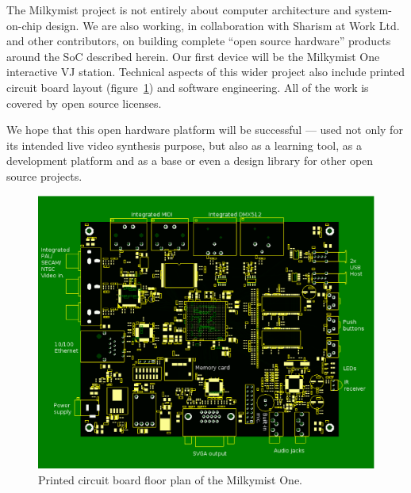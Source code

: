 \documentclass[a4paper,11pt]{kthesis}
\begin{document}
The Milkymist project is not entirely about computer architecture and system-on-chip design. We are also working, in collaboration with Sharism at Work Ltd. and other contributors, on building complete ``open source hardware'' products around the SoC described herein. Our first device will be the Milkymist One interactive VJ station. Technical aspects of this wider project also include printed circuit board layout (figure~\ref{fig:mm1}) and software engineering. All of the work is covered by open source licenses.

We hope that this open hardware platform will be successful --- used not only for its intended live video synthesis purpose, but also as a learning tool, as a development platform and as a base or even a design library for other open source projects.

\begin{figure}[htp]
\centering
\includegraphics[width=\textwidth]{mm1.eps}
\caption{Printed circuit board floor plan of the Milkymist One.}
\label{fig:mm1}
\end{figure}

{}

\end{document}

